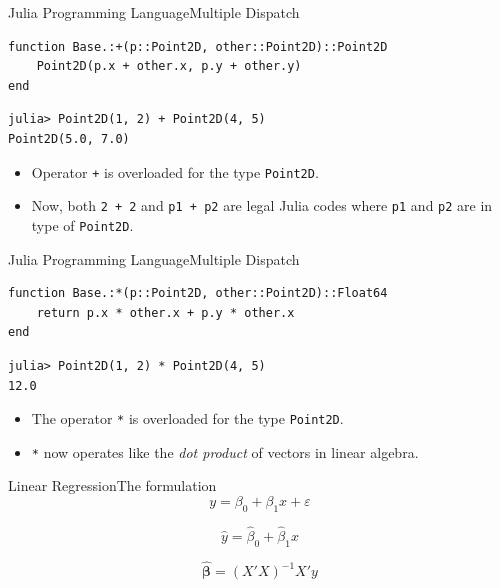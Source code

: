 \documentclass[11pt]{beamer}
\begin{document}
\begin{frame}[fragile]{Julia Programming Language}{Multiple Dispatch}
\begin{lstlisting}[basicstyle=\small]
function Base.:+(p::Point2D, other::Point2D)::Point2D
	Point2D(p.x + other.x, p.y + other.y)
end 
\end{lstlisting}
\begin{lstlisting}
julia> Point2D(1, 2) + Point2D(4, 5)
Point2D(5.0, 7.0)
\end{lstlisting}
\begin{itemize}
\item Operator \texttt{+} is overloaded for the type \texttt{Point2D}.
\item Now, both \texttt{2 + 2} and \texttt{p1 + p2} are legal Julia codes where \texttt{p1} and \texttt{p2} are in type of \texttt{Point2D}.
\end{itemize}
\end{frame}



\begin{frame}[fragile]{Julia Programming Language}{Multiple Dispatch}
\begin{lstlisting}[basicstyle=\small]
function Base.:*(p::Point2D, other::Point2D)::Float64
	return p.x * other.x + p.y * other.x
end 
\end{lstlisting}
\begin{lstlisting}
julia> Point2D(1, 2) * Point2D(4, 5)
12.0
\end{lstlisting}
\begin{itemize}
\item The operator \texttt{*} is overloaded for the type \texttt{Point2D}.
\item \texttt{*} now operates like the \emph{dot product} of vectors in linear algebra.
\end{itemize}
\end{frame}

\begin{frame}[fragile]{Linear Regression}{The formulation}
\begin{equation}
y = \beta_0 + \beta_1 x + \varepsilon
\end{equation}

\begin{equation}
	\hat{y} = \hat{\beta}_0 + \hat{\beta}_1 x 
\end{equation}

\begin{equation}
	\hat{\boldsymbol{\beta}} = (X'X)^{-1}X'y
\end{equation}
\end{frame}
\end{document}
